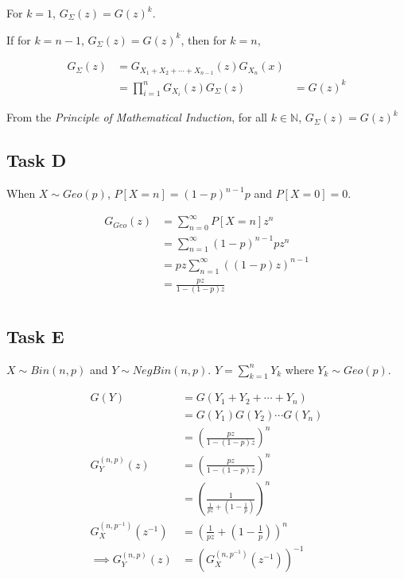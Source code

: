 For $k = 1$, $G_\Sigma(z) = G(z)^k$.

If for $k = n-1$, $G_\Sigma(z) = G(z)^k$, then for $k = n$, 

\begin{align*}
    G_\Sigma(z) &= G_{X_1 + X_2 + \cdots + X_{n-1}}(z)G_{X_n}(x) \\ 
    &= \prod_{i=1}^{n} G_{X_i}(z)
    G_\Sigma(z) &= G(z)^k
\end{align*}

From the \textit{Principle of Mathematical Induction}, for all $k \in \mathbb{N}$, $G_\Sigma(z) = G(z)^k$

\subsection{Task D}

When $X \sim Geo(p)$, $P[X = n] = (1-p)^{n-1}p$ and $P[X = 0] = 0$.

\begin{align*}
    G_{Geo}(z) &= \sum_{n=0}^{\infty} P[X = n]z^n \\
    &= \sum_{n=1}^{\infty} (1-p)^{n-1}pz^n \\
    &= pz \sum_{n=1}^{\infty} ((1-p)z)^{n-1} \\
    &= \frac{pz}{1-(1-p)z} \\
\end{align*}

\subsection{Task E}

$X \sim Bin(n, p)$ and $Y \sim NegBin(n, p)$. $Y = \sum_{k=1}^n Y_k$ where $Y_k \sim Geo(p)$.

\begin{align*}
    G(Y) &= G(Y_1 + Y_2 + \cdots + Y_n) \\
    &= G(Y_1)G(Y_2)\cdots G(Y_n) \\
    &= \left(\frac{pz}{1-(1-p)z}\right)^n \\
    G_Y^{(n, p)}(z) &= \left(\frac{pz}{1-(1-p)z}\right)^n \\
    &= \left(\frac{1}{\frac{1}{pz}+(1-\frac{1}{p})}\right)^n \\
    G_X^{(n, p^{-1})}(z^{-1}) &= \left(\frac{1}{pz}+(1-\frac{1}{p})\right)^n \\
    \implies G_Y^{(n, p)}(z) &= \left(G_X^{(n, p^{-1})}(z^{-1})\right)^{-1}
\end{align*}